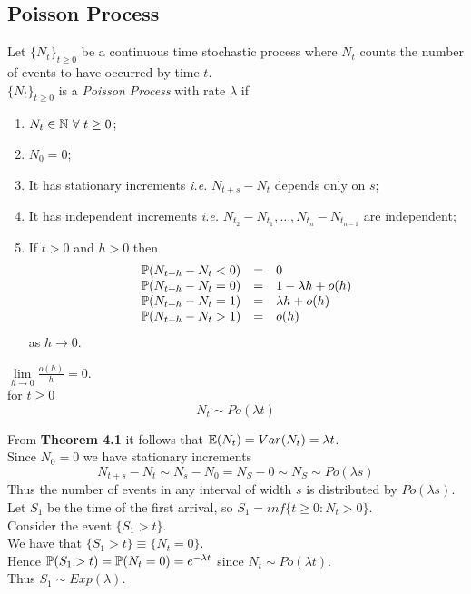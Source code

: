 \documentclass[11pt,a4paper]{article}
\begin{document}
\subsection{Poisson Process}

Let $\{N_t\}_{t\geq0}$ be a continuous time stochastic process where $N_t$ counts the number of events to have occurred by time $t$.\\
$\{N_t\}_{t\geq0}$ is a \textit{Poisson Process} with rate $\lambda$ if
\begin{enumerate}[label=\roman*)]
	\item $N_t\in\nats\ \forall\ t\geq0$;
	\item $N_0=0$;
	\item It has stationary increments \textit{i.e.} $N_{t+s}-N_t$ depends only on $s$;
	\item It has independent increments \textit{i.e.} $N_{t_2}-N_{t_1},\dots,N_{t_n}-N_{t_{n-1}}$ are independent;
	\item If $t>0$ and $h>0$ then
	\[\begin{array}{rcl}
	\mathbb{P}(N_{t+h}-N_t<0)&=&0\\
	\mathbb{P}(N_{t+h}-N_t=0)&=&1-\lambda h+o(h)\\
	\mathbb{P}(N_{t+h}-N_t=1)&=&\lambda h+o(h)\\
	\mathbb{P}(N_{t+h}-N_t>1)&=&o(h)
	\end{array}\]
	as $h\to0$.
\end{enumerate}
\nb $\lim\limits_{h\to0}\frac{o(h)}{h}=0$.\\

for $t\geq0$
$$N_t\sim Po(\lambda t)$$


From \textbf{Theorem 4.1} it follows that $\mathbb{E}(N_t)=Var(N_t)=\lambda t$.\\
Since $N_0=0$ we have stationary increments
$$N_{t+s}-N_t\sim N_s-N_0=N_S-0\sim N_S\sim Po(\lambda s)$$
Thus the number of events in any interval of width $s$ is distributed by $Po(\lambda s)$.\\

Let $S_1$ be the time of the first arrival, so $S_1=inf\{t\geq0:N_t>0\}$.\\
Consider the event $\{S_1>t\}$.\\
We have that $\{S_1>t\}\equiv\{N_t=0\}$.\\
Hence $\mathbb{P}(S_1>t)=\mathbb{P}(N_t=0)=e^{-\lambda t}$ since $N_t\sim Po(\lambda t)$.\\
Thus $S_1\sim Exp(\lambda)$.\\
\end{document}

